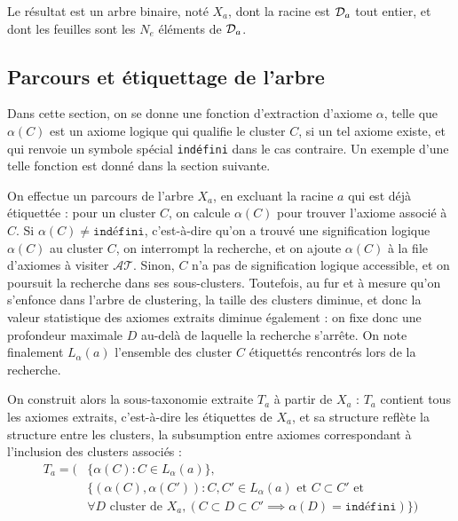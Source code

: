 {Le résultat est un arbre binaire, noté $X_a$, dont la racine est $\cal{D}_a$ tout entier, et dont les feuilles sont les $N_e$ éléments de $\cal{D}_a$. 

}
\fi

\subsection{Parcours et étiquettage de l'arbre}
\label{subsec:texp-tree-labelling}


Dans cette section, on se donne une fonction d'extraction d'axiome $\alpha$, telle que $\alpha(C)$ est un axiome logique qui qualifie le cluster $C$, si un tel axiome existe, et qui renvoie un symbole spécial \texttt{indéfini} dans le cas contraire. 
Un exemple d'une telle fonction est donné dans la section suivante. 

On effectue un parcours de l'arbre $X_a$, en excluant la racine $a$ qui est déjà étiquettée : pour un cluster $C$, on calcule $\alpha(C)$ pour trouver l'axiome associé à $C$. 
Si $\alpha(C) \neq \texttt{indéfini}$, c'est-à-dire qu'on a trouvé une signification logique $\alpha(C)$ au cluster $C$, on interrompt la recherche, et on ajoute $\alpha(C)$ à la file d'axiomes à visiter 
$\mathcal{AT}$. Sinon, $C$ n'a pas de signification logique accessible, et on poursuit la recherche dans ses sous-clusters. Toutefois, au fur et à mesure qu'on s'enfonce dans l'arbre de clustering, la taille des clusters diminue, et donc la valeur statistique des axiomes extraits diminue également : on fixe donc une profondeur maximale $D$ au-delà de laquelle la recherche s'arrête.
%
On note finalement $L_\alpha(a)$ l'ensemble des cluster $C$ étiquettés rencontrés lors de la recherche.


On construit alors la sous-taxonomie extraite $T_a$ à partir de $X_a$ : $T_a$ contient tous les axiomes extraits, c'est-à-dire les étiquettes de $X_a$, et sa structure reflète la structure entre les clusters, la subsumption entre axiomes correspondant à l'inclusion des clusters associés :
\begin{align}
    T_a = (& \{ \alpha(C) : C \in L_\alpha(a) \}, \nonumber \\
        & \{ (\alpha(C), \alpha(C')) : C, C' \in L_\alpha(a) \textrm{ et } C \subset C' \textrm{ et} \nonumber  \\
    & \forall D \textrm{ cluster de } X_a, (C \subset D \subset C' \implies \alpha(D) = \texttt{indéfini})\})
\end{align}

